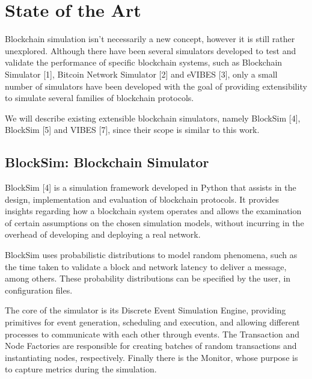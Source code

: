 

\chapter{State of the Art}
\label{cha:state-of-the-art}

Blockchain simulation isn’t necessarily a new concept, however it is still rather unexplored. Although there have been several simulators developed to test and validate the performance of specific blockchain systems, such as Blockchain Simulator [1], Bitcoin Network Simulator [2] and eVIBES [3], only a small number of simulators have been developed with the goal of providing extensibility to simulate several families of blockchain protocols.

We will describe existing extensible blockchain simulators, namely BlockSim [4], BlockSim [5] and VIBES [7], since their scope is similar to this work.


\section{BlockSim: Blockchain Simulator}
\label{sec:blocksim1}

BlockSim [4] is a simulation framework developed in Python that assists in the design, implementation and evaluation of blockchain protocols. It provides insights regarding how a blockchain system operates and allows the examination of certain assumptions on the chosen simulation models, without incurring in the overhead of developing and deploying  a real network.

BlockSim uses probabilistic distributions to model random phenomena, such as the time taken to validate a block and network latency to deliver a message, among others. These probability distributions can be specified by the user, in configuration files.

The core of the simulator is its Discrete Event Simulation Engine, providing primitives for event generation, scheduling and execution, and allowing different processes to communicate with each other through events. The Transaction and Node Factories are responsible for creating batches of random transactions and instantiating nodes, respectively. Finally there is the Monitor, whose purpose is to capture metrics during the simulation.

